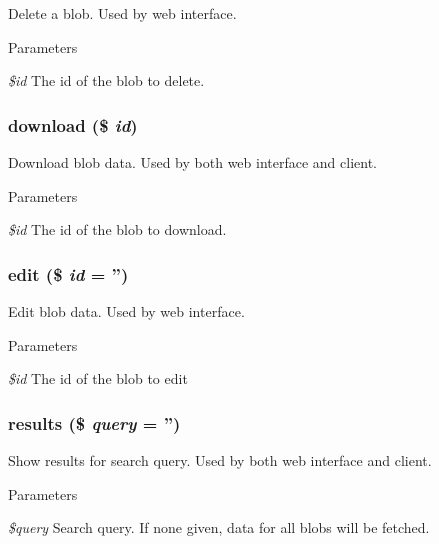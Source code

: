 \label{class_blobs_controller_a2f8258add505482d7f00ea26493a5723}
Delete a blob. Used by web interface. 
\begin{DoxyParams}{Parameters}
\item[{\em \$id}]The id of the blob to delete. \end{DoxyParams}
\hypertarget{class_blobs_controller_ad6a5f919a44257e2b5a5109cc6fc5fe2}{
\subsubsection[{download}]{\setlength{\rightskip}{0pt plus 5cm}download (\$ {\em id})}}
\label{class_blobs_controller_ad6a5f919a44257e2b5a5109cc6fc5fe2}
Download blob data. Used by both web interface and client. 
\begin{DoxyParams}{Parameters}
\item[{\em \$id}]The id of the blob to download. \end{DoxyParams}
\hypertarget{class_blobs_controller_a9fd85873077eb2ff7e455de3b95af38f}{
\subsubsection[{edit}]{\setlength{\rightskip}{0pt plus 5cm}edit (\$ {\em id} = {\ttfamily ''})}}
\label{class_blobs_controller_a9fd85873077eb2ff7e455de3b95af38f}
Edit blob data. Used by web interface. 
\begin{DoxyParams}{Parameters}
\item[{\em \$id}]The id of the blob to edit \end{DoxyParams}
\hypertarget{class_blobs_controller_ab633a32e024a1dc81243c199d7a8e4d7}{
\subsubsection[{results}]{\setlength{\rightskip}{0pt plus 5cm}results (\$ {\em query} = {\ttfamily ''})}}
\label{class_blobs_controller_ab633a32e024a1dc81243c199d7a8e4d7}
Show results for search query. Used by both web interface and client. 
\begin{DoxyParams}{Parameters}
\item[{\em \$query}]Search query. If none given, data for all blobs will be fetched. \end{DoxyParams}
